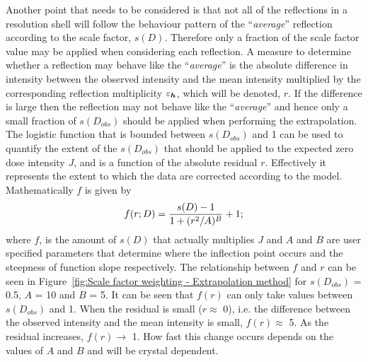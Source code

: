 Another point that needs to be considered is that not all of the reflections in a resolution shell will follow the behaviour pattern of the ``\textit{average}'' reflection according to the scale factor, $s(D)$.
Therefore only a fraction of the scale factor value may be applied when considering each reflection.
A measure to determine whether a reflection may behave like the ``\textit{average}'' is the absolute difference in intensity between the observed intensity and the mean intensity multiplied by the corresponding reflection multiplicity $\varepsilon_{\boldsymbol{h}}$, which will be denoted, $r$.
If the difference is large then the reflection may not behave like the ``\textit{average}'' and hence only a small fraction of $s(D_{obs})$ should be applied when performing the extrapolation.
The logistic function that is bounded between $s(D_{obs})$ and 1 can be used to quantify the extent of the $s(D_{obs})$ that should be applied to the expected zero dose intensity $J$, and is a function of the absolute residual $r$.
Effectively it represents the extent to which the data are corrected according to the model.
Mathematically $f$ is given by
\begin{equation}
f(r; D) = \frac{s(D) - 1}{1 + (r^2/A)^B} + 1;
\label{eq:Fraction of scale factor to be applied - Extrapolation method}
\end{equation}
where $f$, is the amount of $s(D)$ that actually multiplies $J$ and $A$ and $B$ are user specified parameters that determine where the inflection point occurs and the steepness of function slope respectively.
The relationship between $f$ and $r$ can be seen in Figure~\ref{fig:Scale factor weighting - Extrapolation method} for $s(D_{obs})$ = 0.5, $A$ = 10 and $B$ = 5.
It can be seen that $f(r)$ can only take values between $s(D_{obs})$ and 1.
When the residual is small ($r \approx$ 0), i.e. the difference between the observed intensity and the mean intensity is small, $f(r) \approx$ 5.
As the residual increases, $f(r) \rightarrow$ 1.
How fast this change occurs depends on the values of $A$ and $B$ and will be crystal dependent.
